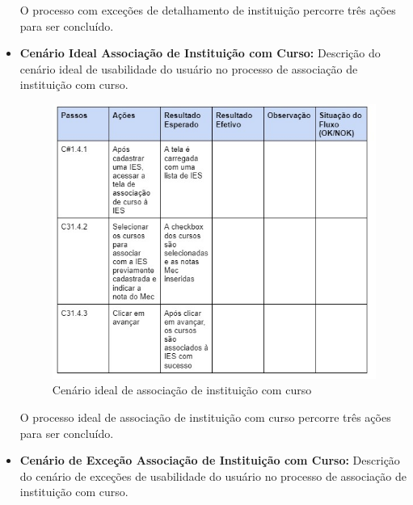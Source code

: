 \begin{itemize}
O processo com exceções de detalhamento de instituição percorre três ações para ser concluído.

\newpage
     
     \item \textbf{Cenário Ideal Associação de Instituição com Curso:}
Descrição do cenário ideal de usabilidade do usuário no processo de associação de instituição com curso.

\begin{figure}[ht]
        \centering
\includegraphics[width=1.0\textwidth]{images/teste-asso-instituicao-curso-feliz.jpg}
        \caption{Cenário ideal de associação de instituição com curso}
        \label{commitsAturo}
    \end{figure}

O processo ideal de associação de instituição com curso percorre três ações para ser concluído.


\newpage

\item \textbf{Cenário de Exceção Associação de Instituição com Curso:}
Descrição do cenário de exceções de usabilidade do usuário no processo de associação de instituição com curso.


\end{itemize}
